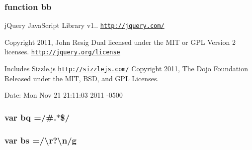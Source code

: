 \subsubsection[{bb}]{\setlength{\rightskip}{0pt plus 5cm}function bb}\label{docs_2_programmer's_manual_2html_2jquery_8js_a1d6558865876e1c8cca029fce41a4bdb}
j\+Query Java\+Script Library v1.. \href{http://jquery.com/}{\tt http\+://jquery.\+com/}

Copyright 2011, John Resig Dual licensed under the M\+I\+T or G\+P\+L Version 2 licenses. \href{http://jquery.org/license}{\tt http\+://jquery.\+org/license}

Includes Sizzle.\+js \href{http://sizzlejs.com/}{\tt http\+://sizzlejs.\+com/} Copyright 2011, The Dojo Foundation Released under the M\+I\+T, B\+S\+D, and G\+P\+L Licenses.

Date\+: Mon Nov 21 21\+:11\+:03 2011 -\/0500 \hypertarget{docs_2_programmer's_manual_2html_2jquery_8js_af6ee77c71b2c89bdb365145ac5ad1219}{}
\subsubsection[{bq}]{\setlength{\rightskip}{0pt plus 5cm}var bq =/\#.$\ast$\$/}\label{docs_2_programmer's_manual_2html_2jquery_8js_af6ee77c71b2c89bdb365145ac5ad1219}
\hypertarget{docs_2_programmer's_manual_2html_2jquery_8js_ae77642f8ef73fb9c20c2a737d956acda}{}
\subsubsection[{bs}]{\setlength{\rightskip}{0pt plus 5cm}var bs =/\textbackslash{}r?\textbackslash{}n/g}\label{docs_2_programmer's_manual_2html_2jquery_8js_ae77642f8ef73fb9c20c2a737d956acda}
\hypertarget{docs_2_programmer's_manual_2html_2jquery_8js_abce695e0af988ece0826d9ad59b8160d}{}
